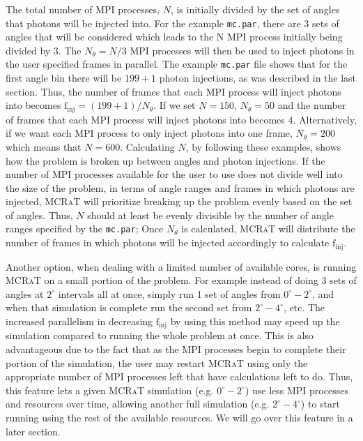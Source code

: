 \documentclass[12pt,a4paper]{article}
\newcommand{\mcrat}{\textsc{MCRaT}}
\begin{document}
 The total number of MPI processes, $N$, is initially divided by the set of angles that photons will be injected into. For the example \texttt{mc.par}, there are $3$ sets of angles that will be considered which leads to the N MPI process initially being divided by 3. The $N_\theta=N/3$ MPI processes will then be used to inject photons in the user specified frames in parallel. The example \texttt{mc.par} file shows that for the first angle bin there will be $199+1$ photon injections, as was described in the last section. Thus, the number of frames that each MPI process will inject photons into becomes $\mathrm{f_{inj}}=(199+1)/N_\theta$. If we set $N=150$, $N_\theta=50$ and the number of frames that each MPI process will inject photons into becomes $4$. Alternatively, if we want each MPI process to only inject photons into one frame, $N_\theta=200$ which means that $N=600$. Calculating $N$, by following these examples, shows how the problem is broken up between angles and photon injections. If the number of MPI processes available for the user to use does not divide well into the size of the problem, in terms of angle ranges and frames in which photons are injected, \mcrat{} will prioritize breaking up the problem evenly based on the set of angles. Thus, $N$ should at least be evenly divisible by the number of angle ranges specified by the \texttt{mc.par}; Once $N_\theta$ is calculated, \mcrat{} will distribute the number of frames in which photons will be injected accordingly to calculate $\mathrm{f_{inj}}$.
 
 Another option, when dealing with a limited number of available cores, is running \mcrat{} on a small portion of the problem. For example instead of doing 3 sets of angles at $2^\circ$ intervals all at once, simply run 1 set of angles from $0^\circ-2^\circ$, and when that simulation is complete run the second set from $2^\circ-4^\circ$, etc. The increased parallelism in decreasing $\mathrm{f_{inj}}$ by using this method may speed up the simulation compared to running the whole problem at once. This is also advantageous due to the fact that as the MPI processes begin to complete their portion of the simulation, the user may restart \mcrat{} using only the appropriate number of MPI processes left that have calculations left to do. Thus, this feature lets a given \mcrat{} simulation (e.g. $0^\circ-2^\circ$) use less MPI processes and resources over time, allowing another full simulation (e.g. $2^\circ-4^\circ$) to start running using the rest of the available resources. We will go over this feature in a later section.
 
\end{document}
